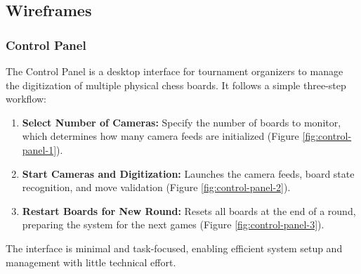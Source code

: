 \subsection{Wireframes}
\label{subsec:wireframe}

\subsubsection*{Control Panel}

The Control Panel is a desktop interface for tournament organizers to manage the digitization of multiple physical chess boards. It follows a simple three-step workflow:

\begin{enumerate}
\item \textbf{Select Number of Cameras:} Specify the number of boards to monitor, which determines how many camera feeds are initialized (Figure \ref{fig:control-panel-1}).
\item \textbf{Start Cameras and Digitization:} Launches the camera feeds, board state recognition, and move validation (Figure \ref{fig:control-panel-2}).
\item \textbf{Restart Boards for New Round:} Resets all boards at the end of a round, preparing the system for the next games (Figure \ref{fig:control-panel-3}).
\end{enumerate}

The interface is minimal and task-focused, enabling efficient system setup and management with little technical effort.

